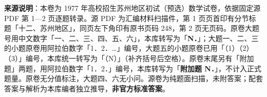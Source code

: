 


\begin{gktip}
\textbf{来源说明}：本卷为 1977 年高校招生苏州地区初试（预选）数学试卷，依据固定源 PDF 第 1—2 页逐题转录。源 PDF 为汇编材料扫描件，第 1 页页首印有分节标题「十二、苏州地区」，同页左下角印有原书页码 248，第 2 页无页码。原卷大题号用中文数字「一、二、三、四、五、六」，本库转写为「\textbf{N．}」；大题一、二、三的小题原卷用阿拉伯数字「1．2．…」编号，大题五的小题原卷已用「（1）（2）（3）」编号，本库统一转写为「（N）」（补齐括号后空格）。原卷末尾另有「附加题」两题，用阿拉伯数字「1．2．」编号，本库转写为「\textbf{附加题 N．}」，不计入正式题量。原卷无分值标注，大题四、六无小问。源卷为纯题面扫描，未附答案；配套答案与解析为本库编者独立推导，\textbf{非官方标准答案}。
\end{gktip}

\par\medskip


